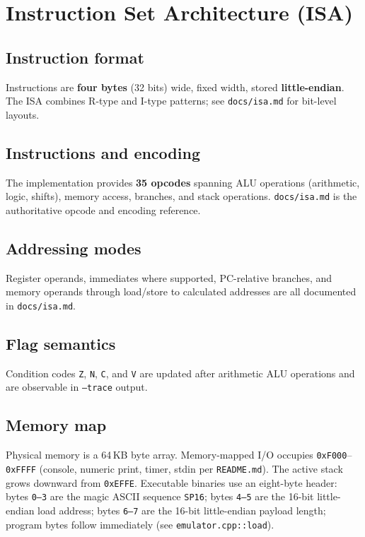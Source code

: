 \documentclass[12pt]{article}
\begin{document}
\section{Instruction Set Architecture (ISA)}
\subsection{Instruction format}
Instructions are \textbf{four bytes} (32 bits) wide, fixed width, stored \textbf{little-endian}. The ISA combines R-type and I-type patterns; see \texttt{docs/isa.md} for bit-level layouts.

\subsection{Instructions and encoding}
The implementation provides \textbf{35 opcodes} spanning ALU operations (arithmetic, logic, shifts), memory access, branches, and stack operations. \texttt{docs/isa.md} is the authoritative opcode and encoding reference.

\subsection{Addressing modes}
Register operands, immediates where supported, PC-relative branches, and memory operands through load/store to calculated addresses are all documented in \texttt{docs/isa.md}.

\subsection{Flag semantics}
Condition codes \texttt{Z}, \texttt{N}, \texttt{C}, and \texttt{V} are updated after arithmetic ALU operations and are observable in \texttt{--trace} output.

\subsection{Memory map}
Physical memory is a 64\,KB byte array. Memory-mapped I/O occupies \texttt{0xF000}--\texttt{0xFFFF} (console, numeric print, timer, stdin per \texttt{README.md}). The active stack grows downward from \texttt{0xEFFE}. Executable binaries use an eight-byte header: bytes \texttt{0--3} are the magic ASCII sequence \texttt{SP16}; bytes \texttt{4--5} are the 16-bit little-endian load address; bytes \texttt{6--7} are the 16-bit little-endian payload length; program bytes follow immediately (see \texttt{emulator.cpp::load}).
\end{document}
